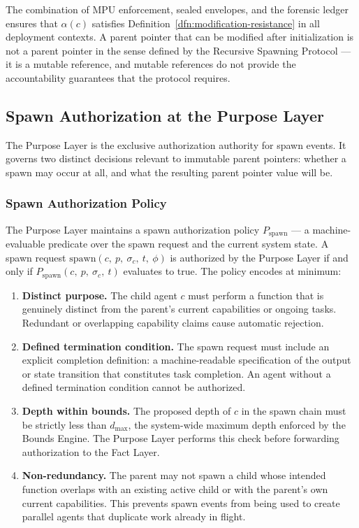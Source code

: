 The combination of MPU enforcement, sealed envelopes, and the forensic ledger ensures that $\alpha(c)$ satisfies Definition~\ref{dfn:modification-resistance} in all deployment contexts. A parent pointer that can be modified after initialization is not a parent pointer in the sense defined by the Recursive Spawning Protocol — it is a mutable reference, and mutable references do not provide the accountability guarantees that the protocol requires.

\subsection{Spawn Authorization at the Purpose Layer}
\label{sec:spawn-authorization}

The Purpose Layer is the exclusive authorization authority for spawn events. It governs two distinct decisions relevant to immutable parent pointers: whether a spawn may occur at all, and what the resulting parent pointer value will be.

\subsubsection{Spawn Authorization Policy}
\label{sec:spawn-auth-policy}

The Purpose Layer maintains a spawn authorization policy $P_{\text{spawn}}$ — a machine-evaluable predicate over the spawn request and the current system state. A spawn request $\mathrm{spawn}(c,\ p,\ \sigma_c,\ t,\ \phi)$ is authorized by the Purpose Layer if and only if $P_{\text{spawn}}(c,\ p,\ \sigma_c,\ t)$ evaluates to true. The policy encodes at minimum:

\begin{enumerate}
    \item \textbf{Distinct purpose.} The child agent $c$ must perform a function that is genuinely distinct from the parent's current capabilities or ongoing tasks. Redundant or overlapping capability claims cause automatic rejection.

    \item \textbf{Defined termination condition.} The spawn request must include an explicit completion definition: a machine-readable specification of the output or state transition that constitutes task completion. An agent without a defined termination condition cannot be authorized.

    \item \textbf{Depth within bounds.} The proposed depth of $c$ in the spawn chain must be strictly less than $d_{\max}$, the system-wide maximum depth enforced by the Bounds Engine. The Purpose Layer performs this check before forwarding authorization to the Fact Layer.

    \item \textbf{Non-redundancy.} The parent may not spawn a child whose intended function overlaps with an existing active child or with the parent's own current capabilities. This prevents spawn events from being used to create parallel agents that duplicate work already in flight.
\end{enumerate}

